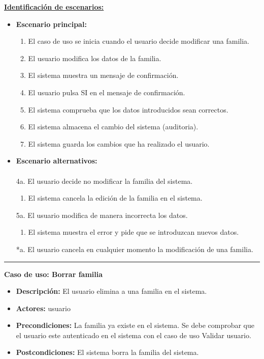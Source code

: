 \underline{\textbf{Identificación de escenarios:}}
\begin{itemize}\renewcommand{\labelitemi}{$\circ$}
 \item \textbf{Escenario principal:}
         \begin{enumerate}
          \item El caso de uso se inicia cuando el usuario decide modificar una familia.
          \item El usuario modifica los datos de la familia.
	  \item El sistema muestra un mensaje de confirmación.
          \item El usuario pulsa SI en el mensaje de confirmación.
          \item El sistema comprueba que los datos introducidos sean correctos.
 	  \item El sistema almacena el cambio del sistema (auditoria).
          \item El sistema guarda los cambios que ha realizado el usuario.
         \end{enumerate}
  \item \textbf{Escenario alternativos:}\\\\	
	4a. El usuario decide no modificar la familia del sistema.
	      \begin{enumerate}
	       \item El sistema cancela la edición de la familia en el sistema.
	      \end{enumerate}
           5a. El usuario modifica de manera incorrecta los datos.
		\begin{enumerate}
		 \item El sistema muestra el error y pide que se introduzcan nuevos datos.
		\end{enumerate}
          *a. El usuario cancela en cualquier momento la modificación de una familia.
\end{itemize}
\smallskip
\hrule height 1pt
\smallskip
\textbf{Caso de uso: Borrar familia}
\begin{itemize}\renewcommand{\labelitemi}{$\cdot$}
 \item \textbf{Descripción:} El usuario elimina a una familia en el sistema.
  \item \textbf{Actores:} usuario
  \item \textbf{Precondiciones:} La familia ya existe en el sistema. Se debe comprobar que el usuario este autenticado en el sistema con el caso de uso Validar usuario.
  \item \textbf{Postcondiciones:} El sistema borra la familia del sistema.
\end{itemize}
